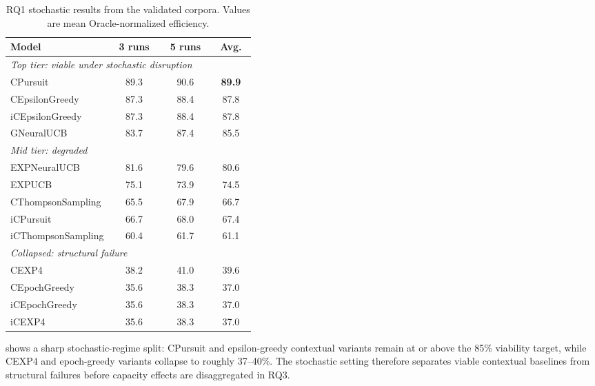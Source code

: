 \begin{table}[ht!]
\footnotesize
\centering
\setlength{\tabcolsep}{4pt}
\caption{RQ1 stochastic results from the validated corpora. Values are mean Oracle-normalized efficiency.}
\label{tab:rq1_master_stochastic}
\begin{tabular}{p{0.42\linewidth} c c c}
\toprule
\textbf{Model} & \textbf{3 runs} & \textbf{5 runs} & \textbf{Avg.} \\
\midrule
\multicolumn{4}{l}{\textit{Top tier: viable under stochastic disruption}} \\
CPursuit & 89.3 & 90.6 & \textbf{89.9} \\
CEpsilonGreedy & 87.3 & 88.4 & 87.8 \\
iCEpsilonGreedy & 87.3 & 88.4 & 87.8 \\
GNeuralUCB & 83.7 & 87.4 & 85.5 \\
\midrule
\multicolumn{4}{l}{\textit{Mid tier: degraded}} \\
EXPNeuralUCB & 81.6 & 79.6 & 80.6 \\
EXPUCB & 75.1 & 73.9 & 74.5 \\
CThompsonSampling & 65.5 & 67.9 & 66.7 \\
iCPursuit & 66.7 & 68.0 & 67.4 \\
iCThompsonSampling & 60.4 & 61.7 & 61.1 \\
\midrule
\multicolumn{4}{l}{\textit{Collapsed: structural failure}} \\
CEXP4 & 38.2 & 41.0 & 39.6 \\
CEpochGreedy & 35.6 & 38.3 & 37.0 \\
iCEpochGreedy & 35.6 & 38.3 & 37.0 \\
iCEXP4 & 35.6 & 38.3 & 37.0 \\
\bottomrule
\end{tabular}
\end{table}

 shows a sharp stochastic-regime split: CPursuit and epsilon-greedy contextual variants remain at or above the 85\% viability target, while CEXP4 and epoch-greedy variants collapse to roughly 37--40\%. The stochastic setting therefore separates viable contextual baselines from structural failures before capacity effects are disaggregated in RQ3.



